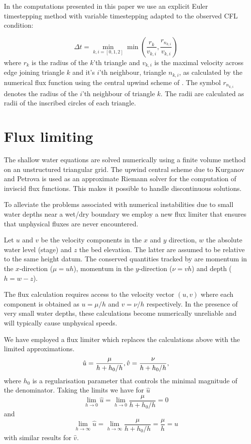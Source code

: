 \documentclass{manual}
\begin{document}
In the computations presented in this paper we use an explicit Euler
timestepping method with variable timestepping adapted to the
observed CFL condition:

\begin{equation}
  \Delta t = \min_{k,i=[0,1,2]}  \min \left( \frac{r_k}{v_{k,i}}, \frac{r_{n_{k,i}}}{v_{k,i}} \right )
  \label{eq:CFL condition}
\end{equation}
where $r_k$ is the radius of the $k$'th triangle and $v_{k,i}$ is the maximal velocity across
edge joining triangle $k$ and it's $i$'th neighbour, triangle $n_{k,i}$, as calculated by the
numerical flux function
using the central upwind scheme of \cite{KurNP2001}. The symbol $r_{n_{k,i}}$  denotes the radius
of the $i$'th neighbour of triangle $k$. The radii are calculated as radii of the inscribed circles
of each triangle.


\section{Flux limiting}

The shallow water equations are solved numerically using a
finite volume method on an unstructured triangular grid.
The upwind central scheme due to Kurganov and Petrova is used as an
approximate Riemann solver for the computation of inviscid flux functions.
This makes it possible to handle discontinuous solutions.

To alleviate the problems associated with numerical instabilities due to
small water depths near a wet/dry boundary we employ a new flux limiter that
ensures that unphysical fluxes are never encountered.

Let $u$ and $v$ be the velocity components in the $x$ and $y$ direction,
$w$ the absolute water level (stage) and
$z$ the bed elevation. The latter are assumed to be relative to the
same height datum.
The conserved quantities tracked by \anuga are momentum in the
$x$-direction ($\mu = uh$), momentum in the $y$-direction ($\nu = vh$)
and depth ($h = w-z$).

The flux calculation requires access to the velocity vector $(u, v)$
where each component is obtained as $u = \mu/h$ and $v = \nu/h$ respectively.
In the presence of very small water depths, these calculations become
numerically unreliable and will typically cause unphysical speeds.

We have employed a flux limiter which replaces the calculations above with
the limited approximations.
\begin{equation}
  \hat{u} = \frac{\mu}{h + h_0/h}, \bigskip \hat{v} = \frac{\nu}{h + h_0/h},
\end{equation}
where $h_0$ is a regularisation parameter that controls the minimal
magnitude of the denominator. Taking the limits we have for $\hat{u}$
\[
  \lim_{h \rightarrow 0} \hat{u} =
  \lim_{h \rightarrow 0} \frac{\mu}{h + h_0/h} = 0
\]
and
\[
  \lim_{h \rightarrow \infty} \hat{u} =
  \lim_{h \rightarrow \infty} \frac{\mu}{h + h_0/h} = \frac{\mu}{h} = u
\]
with similar results for $\hat{v}$.
\end{document}
